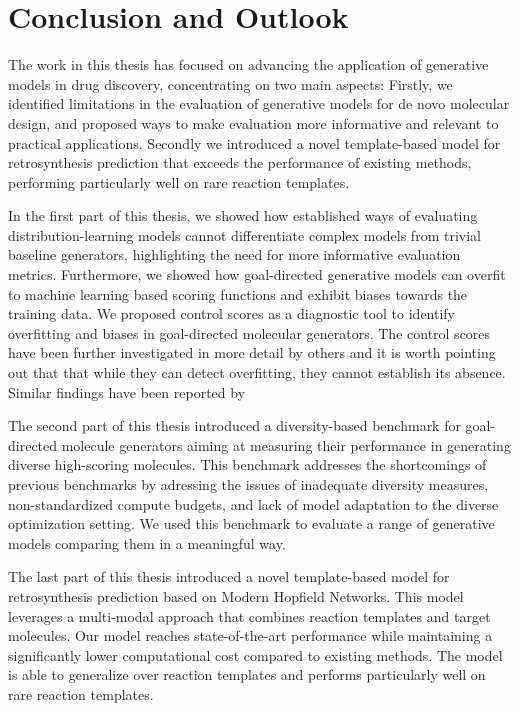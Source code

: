 \chapter{Conclusion and Outlook\label{chap:conclusion}} The work in this thesis has focused on
advancing the application of generative models in drug discovery, concentrating on two main aspects:
Firstly, we identified limitations in the evaluation of generative models for de novo molecular
design, and proposed ways to make evaluation more informative and relevant to practical
applications. Secondly we introduced a novel template-based model for retrosynthesis prediction that
exceeds the performance of existing methods, performing particularly well on rare reaction
templates.

In the first part of this thesis, we showed how established ways of evaluating distribution-learning
models cannot differentiate complex models from trivial baseline generators, highlighting the need
for more informative evaluation metrics. Furthermore, we showed how goal-directed generative models
can overfit to machine learning based scoring functions and exhibit biases towards the training
data. We proposed control scores as a diagnostic tool to identify overfitting and biases in
goal-directed molecular generators. The control scores have been further investigated in more detail
by others \citep{turkMolecularAssaysSimulator2022} and it is worth pointing out that that while they
can detect overfitting, they cannot establish its absence. Similar findings have been reported by

The second part of this thesis introduced a diversity-based benchmark for goal-directed molecule
generators aiming at measuring their performance in generating diverse high-scoring molecules.
This benchmark addresses the shortcomings of previous benchmarks by adressing the issues of
inadequate diversity measures, non-standardized compute budgets, and lack of model adaptation to the
diverse optimization setting. We used this benchmark to evaluate a range of generative models
comparing them in a meaningful way.

The last part of this thesis introduced a novel template-based model for retrosynthesis prediction
based on Modern Hopfield Networks. This model leverages a multi-modal approach that combines
reaction templates and target molecules. Our model reaches state-of-the-art performance while
maintaining a significantly lower computational cost compared to existing methods. The model is able
to generalize over reaction templates and performs particularly well on rare reaction templates.

